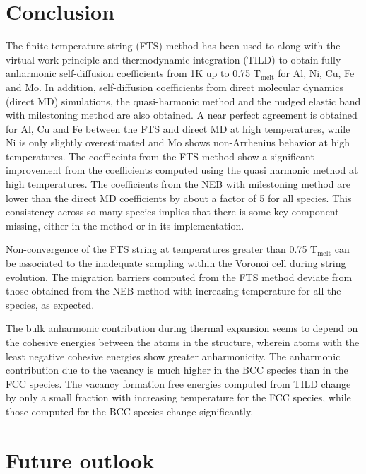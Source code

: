 \documentclass{article}
\begin{document}
\clearpage
\section{Conclusion}

The finite temperature string (FTS) method has been used to along with the virtual work principle and thermodynamic integration (TILD) to obtain fully anharmonic self-diffusion coefficients from 1K up to 0.75 $\mathrm{T_{melt}}$ for Al, Ni, Cu, Fe and Mo. In addition, self-diffusion coefficients from direct molecular dynamics (direct MD) simulations, the quasi-harmonic method and the nudged elastic band with milestoning method are also obtained. A near perfect agreement is obtained for Al, Cu and Fe between the FTS and direct MD at high temperatures, while Ni is only slightly overestimated and Mo shows non-Arrhenius behavior at high temperatures. The coefficeints from the FTS method show a significant improvement from the coefficients computed using the quasi harmonic method at high temperatures. The coefficients from the NEB with milestoning method are lower than the direct MD coefficients by about a factor of 5 for all species. This consistency across so many species implies that there is some key component missing, either in the method or in its implementation.

Non-convergence of the FTS string at temperatures greater than 0.75 $\mathrm{T_{melt}}$ can be associated to the inadequate sampling within the Voronoi cell during string evolution. The migration barriers computed from the FTS method deviate from those obtained from the NEB method with increasing temperature for all the species, as expected.

The bulk anharmonic contribution during thermal expansion seems to depend on the cohesive energies between the atoms in the structure, wherein atoms with the least negative cohesive energies show greater anharmonicity. The anharmonic contribution due to the vacancy is much higher in the BCC species than in the FCC species. The vacancy formation free energies computed from TILD change by only a small fraction with increasing temperature for the FCC species, while those computed for the BCC species change significantly. \\


\clearpage
\section{Future outlook}
\end{document}
